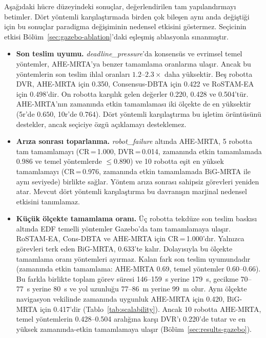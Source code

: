 \documentclass[10pt,letterpaper,onecolumn]{IEEEtran}
\begin{document}
Aşağıdaki hücre düzeyindeki sonuçlar, değerlendirilen tam yapılandırmayı
betimler. Dört yöntemli karşılaştırmada birden çok bileşen aynı anda değiştiği
için bu sonuçlar paradigma değişiminin nedensel etkisini göstermez. Seçicinin
etkisi Bölüm~\ref{sec:gazebo-ablation}'daki eşleşmiş ablasyonla sınanmıştır.

\begin{itemize}
  \item \textbf{Son teslim uyumu.}
    \textit{deadline\_pressure}'da konsensüs ve evrimsel temel yöntemler,
    AHE-MRTA'ya benzer tamamlama oranlarına ulaşır. Ancak bu yöntemlerin son
    teslim ihlal oranları $1.2$--$2.3\times$ daha yüksektir. Beş robotta DVR,
    AHE-MRTA için 0.350, Consensus-DBTA için 0.422 ve RoSTAM-EA için 0.498'dir.
    On robotta karşılık gelen değerler 0.220, 0.428 ve 0.504'tür. AHE-MRTA'nın
    zamanında etkin tamamlaması iki ölçekte de en yüksektir (5r'de $0.650$,
    10r'de $0.764$). Dört yöntemli karşılaştırma bu işletim örüntüsünü
    destekler, ancak seçiciye özgü açıklamayı desteklemez.
  \item \textbf{Arıza sonrası toparlanma.}
    \textit{robot\_failure} altında AHE-MRTA, 5 robotta tam tamamlamayı
    (CR\,=\,1.000, DVR\,=\,0.014, zamanında etkin tamamlamada $0.986$ ve
    temel yöntemlerde ${\leq}0.890$) ve 10 robotta eşit en yüksek tamamlamayı
    (CR\,=\,0.976, zamanında etkin tamamlamada BiG-MRTA ile aynı
    seviyede) birlikte sağlar. Yöntem arıza sonrası sahipsiz görevleri yeniden
    atar. Mevcut dört yöntemli karşılaştırma bu davranışın marjinal nedensel
    etkisini tanımlamaz.
  \item \textbf{Küçük ölçekte tamamlama oranı.} Üç robotta tekdüze son teslim
    baskısı
    altında EDF temelli yöntemler Gazebo'da tam tamamlamaya ulaşır.
    RoSTAM-EA, Cons-DBTA ve AHE-MRTA için CR\,=\,1.000'dır. Yalnızca görevleri
    terk eden BiG-MRTA, 0.633'te kalır. Dolayısıyla bu ölçekte tamamlama oranı
    yöntemleri ayırmaz. Kalan fark son teslim uyumundadır
    (zamanında etkin tamamlama: AHE-MRTA 0.69, temel yöntemler 0.60--0.66).
    Bu farkla birlikte toplam görev süresi 146--159~s yerine 179~s, gecikme
    70--77~s yerine 80~s ve yol uzunluğu 77--86~m yerine 99~m olur. Aynı
    ölçekte navigasyon vekilinde zamanında uygunluk AHE-MRTA için 0.420,
    BiG-MRTA için 0.417'dir
    (Tablo~\ref{tab:scalability}).
    Ancak 10 robotta AHE-MRTA, temel yöntemlerin 0.428--0.504 aralığına karşı
    DVR'ı
    0.220'de tutar ve en yüksek zamanında-etkin tamamlamaya ulaşır
    (Bölüm~\ref{sec:results-gazebo}).
\end{itemize}
\end{document}
